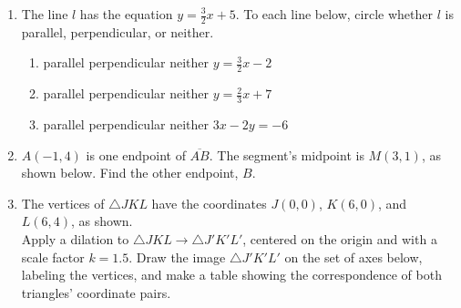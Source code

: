 \documentclass[12pt, twoside]{article}
\begin{document}
\begin{enumerate}
  \item The line $l$ has the equation $y=\frac{3}{2}x+5$. To each line below, circle whether $l$ is parallel, perpendicular, or neither.
    \begin{enumerate}
      \item parallel \quad perpendicular \quad neither \qquad $y=\frac{3}{2}x-2$
      \vspace{0.5cm}
      \item parallel \quad perpendicular \quad neither \qquad $y=\frac{2}{3}x+7$
      \vspace{0.5cm}
      \item parallel \quad perpendicular \quad neither \qquad $3x-2y=-6$
      \vspace{2cm}
    \end{enumerate}

  \item $A(-1,4)$ is one endpoint of $\overline{AB}$. The segment's midpoint is $M(3,1)$, as shown below. Find the other endpoint, $B$.
      \begin{flushright}
      \end{flushright}

\newpage
  \item The vertices of $\triangle JKL$ have the coordinates $J(0,0)$, $K(6,0)$, and $L(6,4)$, as shown. \\[0.25cm]
    Apply a dilation to $\triangle JKL \rightarrow \triangle J'K'L'$, centered on the origin and with a scale factor $k=1.5$. Draw the image $\triangle J'K'L'$ on the set of axes below, labeling the vertices, and make a table showing the correspondence of both triangles' coordinate pairs.
      \begin{flushright}
      \end{flushright}


\end{enumerate}
\end{document}
